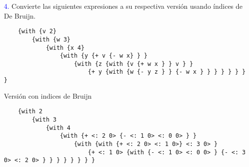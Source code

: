 {\textcolor{blue}{4.}} Convierte las siguientes expresiones a su respectiva versión usando índices de De Bruijn.

\begin{lstlisting}
    {with {v 2}
        {with {w 3}
            {with {x 4}
                {with {y {+ v {- w x} } }
                    {with {z {with {v {+ w x } } v } }
                        {+ y {with {w {- y z } } {- w x } } } } } } } }
\end{lstlisting} 

Versión con indices de Bruijn
\begin{lstlisting}
    {with 2
        {with 3
            {with 4
                {with {+ <: 2 0> {- <: 1 0> <: 0 0> } }
                    {with {with {+ <: 2 0> <: 1 0>} <: 3 0> }
                        {+ <: 1 0> {with {- <: 1 0> <: 0 0> } {- <: 3 0> <: 2 0> } } } } } } } }
\end{lstlisting} 